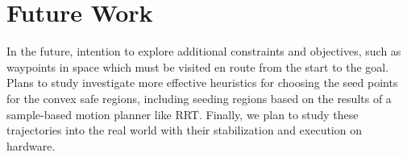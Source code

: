 \section{Future Work}

In the future, intention to explore additional constraints
and objectives, such as waypoints in space which must be
visited en route from the start to the goal. Plans to study
investigate more effective heuristics for choosing the seed
points for the convex safe regions, including seeding regions
based on the results of a sample-based motion planner like 
RRT. Finally, we plan to study these trajectories into the real
world with their stabilization and execution on hardware.